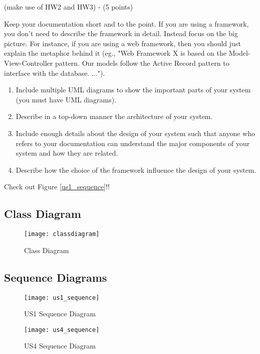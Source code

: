 (make use of HW2 and HW3) - (5 points)

Keep your documentation short and to the point. If you are using a framework, you don't need to describe the framework in detail. Instead focus on the big picture. For instance, if you are using a web framework, then you should just explain the metaphor behind it (eg., "Web Framework X is based on the Model-View-Controller pattern. Our models follow the Active Record pattern to interface with the database. ...").

\begin{enumerate}
	\item Include multiple UML diagrams to show the important parts of your system (you must have UML diagrams).
	\item Describe in a top-down manner the architecture of your system.
	\item Include enough details about the design of your system such that anyone who refers to your documentation can understand the major components of your system and how they are related.
	\item Describe how the choice of the framework influence the design of your system.
\end{enumerate}

Check out Figure \ref{us1_sequence}!!

\renewcommand\listfigurename{List of Diagrams}
\listoffigures

\subsection{Class Diagram}
\begin{figure}[H]
    \centering
    \texttt{[image: classdiagram]}
    \caption{Class Diagram}
    \label{fig:classdiagram}
\end{figure}

\subsection{Sequence Diagrams}
\begin{figure}[H]
    \centering
    \texttt{[image: us1\_sequence]}
    \caption{US1 Sequence Diagram}
    \label{fig:us1_sequence}
\end{figure}

\begin{figure}[H]
    \centering
    \texttt{[image: us4\_sequence]}
    \caption{US4 Sequence Diagram}
    \label{fig:us4_sequence}
\end{figure}

